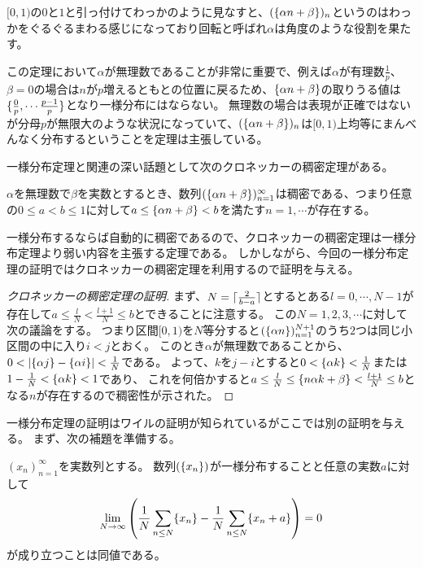 $[0, 1)$の$0$と$1$と引っ付けてわっかのように見なすと、$(\{\alpha n+\beta\})_n$というのはわっかをぐるぐるまわる感じになっており回転と呼ばれ$\alpha$は角度のような役割を果たす。

この定理において$\alpha$が無理数であることが非常に重要で、例えば$\alpha$が有理数$\frac{1}{p}$、$\beta = 0$の場合は$n$が$p$増えるともとの位置に戻るため、$\{\alpha n+\beta\}$の取りうる値は$\{ \frac{0}{p}, \cdots \frac{p-1}{p} \}$となり一様分布にはならない。
無理数の場合は表現が正確ではないが分母$p$が無限大のような状況になっていて、$(\{\alpha n+\beta\})_n$は$[0, 1)$上均等にまんべんなく分布するということを定理は主張している。

一様分布定理と関連の深い話題として次のクロネッカーの稠密定理がある。

\begin{theorem}[クロネッカーの稠密定理]
$\alpha$を無理数で$\beta$を実数とするとき、数列$(\{\alpha n+\beta\})_{n = 1}^\infty$は稠密である、つまり任意の$0 \le a < b \le 1$に対して$a \le \{\alpha n+\beta\} < b$を満たす$n = 1, \cdots$が存在する。
\end{theorem}

一様分布するならば自動的に稠密であるので、クロネッカーの稠密定理は一様分布定理より弱い内容を主張する定理である。
しかしながら、今回の一様分布定理の証明ではクロネッカーの稠密定理を利用するので証明を与える。

\begin{proof}[クロネッカーの稠密定理の証明]
まず、$N = \lceil\frac{2}{b-a}\rceil$とするとある$l = 0, \cdots, N-1$が存在して$a \le \frac{l}{N} < \frac{l+1}{N} \le b$とできることに注意する。
この$N = 1, 2, 3, \cdots$に対して次の議論をする。
つまり区間$[0, 1)$を$N$等分すると$(\{\alpha n\})_{n = 1}^{N+1}$のうち$2$つは同じ小区間の中に入り$i < j$とおく。
このとき$\alpha$が無理数であることから、$0 < |\{\alpha j\}-\{\alpha i\}| < \frac{1}{N}$である。
よって、$k$を$j-i$とすると$0 < \{\alpha k\} < \frac{1}{N}$または$1-\frac{1}{N} < \{\alpha k\} < 1$であり、
これを何倍かすると$a \le \frac{l}{N} \le \{n\alpha k+\beta\} < \frac{l+1}{N} \le b$となる$n$が存在するので稠密性が示された。
\end{proof}

一様分布定理の証明はワイルの証明が知られているがここでは別の証明を与える。
まず、次の補題を準備する。

\begin{lemma}
$(x_n)_{n = 1}^\infty$を実数列とする。
数列$(\{x_n\})$が一様分布することと任意の実数$a$に対して
$$
\lim_{N \to \infty}\qty(\frac{1}{N}\sum_{n \le N}\{x_n\}-\frac{1}{N}\sum_{n \le N}\{x_n+a\}) = 0
$$
が成り立つことは同値である。
\end{lemma}

